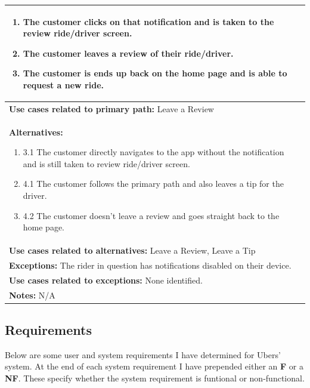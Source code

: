 \documentclass{article}
\begin{document}
\begin{center}
\begin{tabular}[H]{|p{14cm}|p{6cm}|}
\begin{enumerate}
        \item The customer clicks on that notification and is taken to the review ride/driver screen.
        \item The customer leaves a review of their ride/driver.
        \item The customer is ends up back on the home page and is able to request a new ride.
      \end{enumerate} \\
      \hline
      \textbf{Use cases related to primary path:} Leave a Review \\
      \hline
      \textbf{Alternatives:} 
      \begin{enumerate}[label=]
        \item 3.1 The customer directly navigates to the app without the notification and is still taken to review ride/driver screen.
        \item 4.1 The customer follows the primary path and also leaves a tip for the driver.
        \item 4.2 The customer doesn't leave a review and goes straight back to the home page.
      \end{enumerate} \\
      \hline
      \textbf{Use cases related to alternatives:} Leave a Review, Leave a Tip \\
      \hline
      \textbf{Exceptions:} The rider in question has notifications disabled on their device. \\
      \hline
      \textbf{Use cases related to exceptions:} None identified. \\
      \hline
      \textbf{Notes:} N/A \\
      \hline
    \end{tabular}
  \end{center}

    \subsection{Requirements}

    Below are some user and system requirements I have determined for Ubers' system. At the end of each system requirement I have prepended either an \textbf{F}
    or a \textbf{NF}. These specify whether the system requirement is funtional or non-functional.
\end{document}

